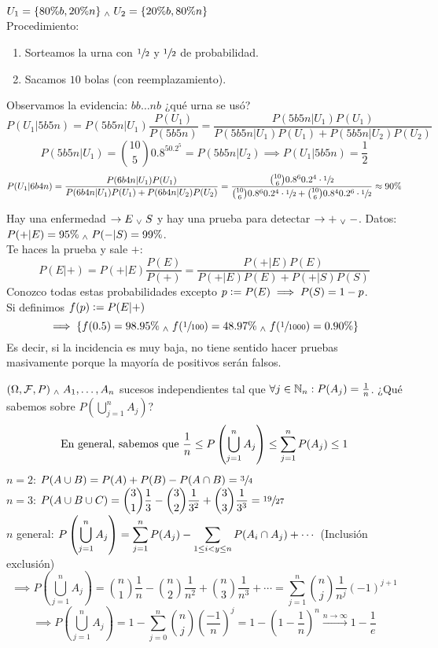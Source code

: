 \begin{ejem}
    $U_1=\{80\%b, 20\%n\} \; _{\wedge} \; U_2=\{20\%b, 80\%n\}$ \\
    Procedimiento:
    \begin{enumerate}
        \item Sorteamos la urna con $\sfrac{1}{2}$ y $\sfrac{1}{2}$ de probabilidad.
        \item Sacamos $10$ bolas (con reemplazamiento).
    \end{enumerate}
    Observamos la evidencia: $bb\dots nb$ ¿qué urna se usó?
    \[P(U_1|5b5n)=P(5b5n|U_1)\frac{P(U_1)}{P(5b5n)}=\frac{P(5b5n|U_1)P(U_1)}{P(5b5n|U_1)P(U_1)+P(5b5n|U_2)P(U_2)}\]
    \[P(5b5n|U_1)=\binom{10}{5}0.8^50.2^5=P(5b5n|U_2) \implies P(U_1|5b5n)=\frac{1}{2}\]
    \[P(U_1|6b4n)=\frac{P(6b4n|U_1)P(U_1)}{P(6b4n|U_1)P(U_1)+P(6b4n|U_2)P(U_2)} = \frac{\binom{10}{6}0.8^60.2^4\cdot\sfrac{1}{2}}{\binom{10}{6}0.8^60.2^4\cdot\sfrac{1}{2} + \binom{10}{6}0.8^40.2^6\cdot\sfrac{1}{2}}\approx90\%\]
\end{ejem}

\begin{ejem}
    Hay una enfermedad $\rightarrow E \; _{\vee} \; S$ y hay una prueba para detectar $\rightarrow + \; _{\vee} \; -$. Datos: $P(+ | E)=95\% \; _{\wedge} \; P(-| S)=99\%$.\\
    Te haces la prueba y sale $+$:
    \[P(E|+)=P(+|E)\frac{P(E)}{P(+)}=\frac{P(+|E)P(E)}
    {P(+|E)P(E)+P(+|S)P(S)}\]
    Conozco todas estas probabilidades excepto $p\vcentcolon= P(E) \implies P(S)=1-p$.\\
    Si definimos $f(p)\vcentcolon= P(E|+)$ \[\implies \{f(0.5)=98.95\% \; _{\wedge} \; f(\sfrac{1}{100}) = 48.97\%\; _{\wedge} \; f(\sfrac{1}{1000}) = 0.90\% \}\]
    Es decir, si la incidencia es muy baja, no tiene sentido hacer pruebas masivamente porque la mayoría de positivos serán falsos.
\end{ejem}
 \begin{ejem}
     $(\Omega, \mathcal{F}, P) \; _{\wedge} \; A_1, \dots, A_n$ sucesos independientes tal que $\forall j \in \mathbb{N}_n : P(A_j)=\frac{1}{n}$. ¿Qué sabemos sobre $P\left(\bigcup_{j=1}^n A_j\right)$?
     \[\text{En general, sabemos que } \frac{1}{n}\leq P\left(\bigcup_{j=1}^n A_j\right) \leq \sum_{j=1}^nP(A_j)\leq 1\]
     $n=2$: $\displaystyle P(A\cup B)=P(A)+P(B)-P(A\cap B)=\sfrac{3}{4}$ \\
     $n=3$: $\displaystyle P(A\cup B\cup C)=\binom{3}{1}\frac{1}{3}-\binom{3}{2}\frac{1}{3^2}+\binom{3}{3}\frac{1}{3^3}=\sfrac{19}{27}$ \\
     $n$ general: $\displaystyle P\left(\bigcup_{j=1}^n A_j\right)=\sum_{j=1}^nP(A_j)-\sum_{1\leq i<y\leq n} P(A_i\cap A_j) + \cdots$ (Inclusión exclusión)
     \[\implies P\left(\bigcup_{j=1}^n A_j\right)= \binom{n}{1}\frac{1}{n} - \binom{n}{2}\frac{1}{n^2} + \binom{n}{3}\frac{1}{n^3} + \cdots=\sum_{j=1}^n\binom{n}{j}\frac{1}{n^j}(-1)^{j+1}\]
     \[\implies P\left(\bigcup_{j=1}^n A_j\right)= 1-\sum_{j=0}^n\binom{n}{j}\left(\frac{-1}{n}\right)^j=1-\left(1-\frac{1}{n}\right)^n\xrightarrow{n\rightarrow\infty}1-\frac{1}{e}\]
 \end{ejem}

